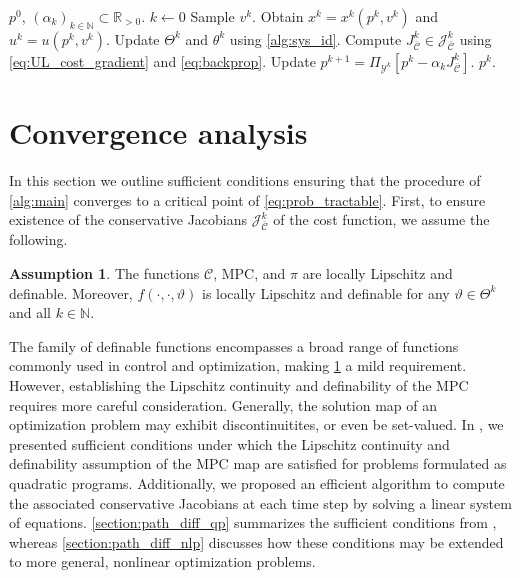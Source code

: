 \documentclass[journal,twoside,web,final]{ieeecolor}
\theoremstyle{definition}
\newtheorem{assumption}{Assumption}
\newcommand{\R}{\mathbb{R}}
\newcommand{\N}{\mathbb{N}}
\newcommand{\J}{\mathcal{J}}
\newcommand{\Cb}{{\bar{\mathcal{C}}}}
\begin{document}
\begin{algorithm}
\caption{Proposed algorithm.}\label{alg:main}
\begin{algorithmic}[1]
\Input $p^0$, $(\alpha_k) _{k\in\N} \subset \R_{>0}$.
\Init $k \gets 0$
    \State Sample $v^k$.
    \State Obtain $x^k=x^k(p^k,v^k)$ and $u^k=u(p^k,v^k)$.
    \State Update $\Theta^k$ and $\theta^k$ using \cref{alg:sys_id}.
    \State Compute $J_\Cb^k\in\J_\Cb^k$ using \cref{eq:UL_cost_gradient} and \cref{eq:backprop}.
    \State Update $p^{k+1} = \Pi_{\mathcal{Y}^k}[p^k - \alpha_k J_\Cb^k]$.
\EndWhile
\State \Return $p^k$.
\end{algorithmic}
\end{algorithm}

\section{Convergence analysis}
\label{section:convergence}
In this section we outline sufficient conditions ensuring that the procedure of \cref{alg:main} converges to a critical point of \cref{eq:prob_tractable}.
First, to ensure existence of the conservative Jacobians $\J_\Cb^k$ of the cost function, we assume the following.
%
\begin{assumption}\label{ass:local_lip_and_definability}
The functions $\mathcal{C}$, $\text{MPC}$, and $\pi$ are locally Lipschitz and definable. Moreover, $f(\cdot,\cdot,\vartheta)$ is locally Lipschitz and definable for any $\vartheta\in \Theta^k$ and all $k\in\N$.
\end{assumption}
%
The family of definable functions encompasses a broad range of functions commonly used in control and optimization, making \cref{ass:local_lip_and_definability} a mild requirement. However, establishing the Lipschitz continuity and definability of the $\text{MPC}$ requires more careful consideration. Generally, the solution map of an optimization problem may exhibit discontinuitites, or even be set-valued. In \cite{zuliani2023bp}, we presented sufficient conditions under which the Lipschitz continuity and definability assumption of the MPC map are satisfied for problems formulated as quadratic programs. Additionally, we proposed an efficient algorithm to compute the associated conservative Jacobians at each time step by solving a linear system of equations. \cref{section:path_diff_qp} summarizes the sufficient conditions from \cite{zuliani2023bp}, whereas \cref{section:path_diff_nlp} discusses how these conditions may be extended to more general, nonlinear optimization problems.
\end{document}
